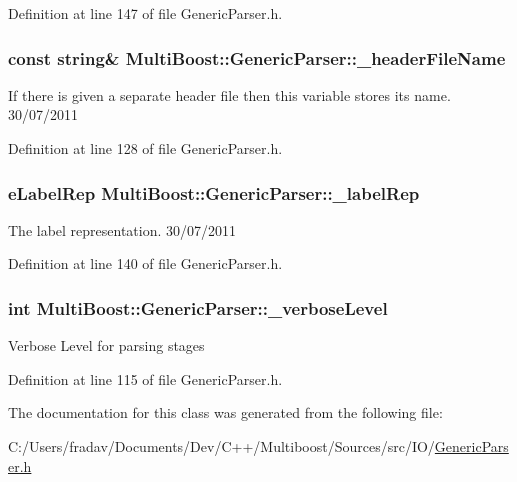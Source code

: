 Definition at line 147 of file Generic\-Parser.\-h.

\hypertarget{classMultiBoost_1_1GenericParser_a0569fb29d9603285df0fe30fc6cf6c87}{
\subsubsection[{\-\_\-header\-File\-Name}]{\setlength{\rightskip}{0pt plus 5cm}const string\& Multi\-Boost\-::\-Generic\-Parser\-::\-\_\-header\-File\-Name\hspace{0.3cm}{\ttfamily [protected]}}}\label{classMultiBoost_1_1GenericParser_a0569fb29d9603285df0fe30fc6cf6c87}
If there is given a separate header file then this variable stores its name.  30/07/2011 

Definition at line 128 of file Generic\-Parser.\-h.

\hypertarget{classMultiBoost_1_1GenericParser_ab06970eec068271831eda07846defb8b}{
\subsubsection[{\-\_\-label\-Rep}]{\setlength{\rightskip}{0pt plus 5cm}e\-Label\-Rep Multi\-Boost\-::\-Generic\-Parser\-::\-\_\-label\-Rep\hspace{0.3cm}{\ttfamily [protected]}}}\label{classMultiBoost_1_1GenericParser_ab06970eec068271831eda07846defb8b}
The label representation.  30/07/2011 

Definition at line 140 of file Generic\-Parser.\-h.

\hypertarget{classMultiBoost_1_1GenericParser_a46c61253bc59b8bcff0bbb5bd1536a41}{
\subsubsection[{\-\_\-verbose\-Level}]{\setlength{\rightskip}{0pt plus 5cm}int Multi\-Boost\-::\-Generic\-Parser\-::\-\_\-verbose\-Level}}\label{classMultiBoost_1_1GenericParser_a46c61253bc59b8bcff0bbb5bd1536a41}
Verbose Level for parsing stages 

Definition at line 115 of file Generic\-Parser.\-h.



The documentation for this class was generated from the following file\-:\begin{DoxyCompactItemize}
\item 
C\-:/\-Users/fradav/\-Documents/\-Dev/\-C++/\-Multiboost/\-Sources/src/\-I\-O/\hyperlink{GenericParser_8h}{Generic\-Parser.\-h}\end{DoxyCompactItemize}
